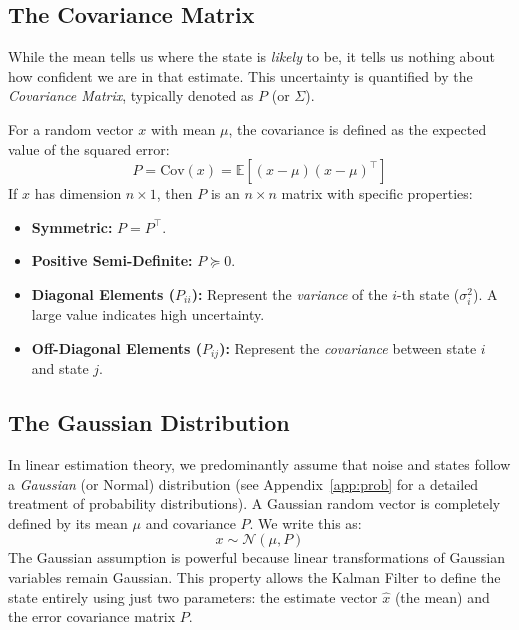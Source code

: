 \subsection{The Covariance Matrix}
While the mean tells us where the state is \textit{likely} to be, it tells us nothing about how confident we are in that estimate. This uncertainty is quantified by the \emph{Covariance Matrix}, typically denoted as $P$ (or $\Sigma$).

For a random vector $x$ with mean $\mu$, the covariance is defined as the expected value of the squared error:
\begin{equation*}
	P = \text{Cov}(x) = \mathbb{E}\left[ (x - \mu)(x - \mu)^\top \right]
\end{equation*}
If $x$ has dimension $n \times 1$, then $P$ is an $n \times n$ matrix with specific properties:
\begin{itemize}
	\item \textbf{Symmetric:} $P = P^\top$.
	\item \textbf{Positive Semi-Definite:} $P \succeq 0$.
	\item \textbf{Diagonal Elements ($P_{ii}$):} Represent the \textit{variance} of the $i$-th state ($\sigma_i^2$). A large value indicates high uncertainty.
	\item \textbf{Off-Diagonal Elements ($P_{ij}$):} Represent the \textit{covariance} between state $i$ and state $j$.
\end{itemize}

\subsection{The Gaussian Distribution}
In linear estimation theory, we predominantly assume that noise and states follow a \emph{Gaussian} (or Normal) distribution (see Appendix~\ref{app:prob} for a detailed treatment of probability distributions). A Gaussian random vector is completely defined by its mean $\mu$ and covariance $P$. We write this as:
\begin{equation*}
	x \sim \mathcal{N}(\mu, P)
\end{equation*}
The Gaussian assumption is powerful because linear transformations of Gaussian variables remain Gaussian. This property allows the Kalman Filter to define the state entirely using just two parameters: the estimate vector $\hat{x}$ (the mean) and the error covariance matrix $P$.

